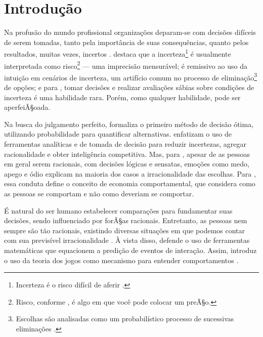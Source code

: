 \documentclass[
	article,			        %
	11pt,				          %
	oneside,			        %
	a4paper,			        %
	english,			        %
	brazil,				        %
	sumario=tradicional
]{abntex2}\usepackage[]{graphicx}\usepackage[]{color}
\begin{document}

\textual

\section*{Introdução}

Na profusão do mundo profissional organizações deparam-se com decisões difíceis de serem tomadas, tanto pela importância de suas consequências, quanto pelos resultados, muitas vezes, incertos \cite{Bekman.2009}.  destaca que a incerteza\footnote{Incerteza é o risco difícil de aferir \cite{Nate.2012}.} é usualmente interpretada como risco\footnote{Risco, conforme , é algo em que você pode colocar um preÃ§o.} --- uma imprecisão mensurável;  é remissivo ao uso da intuição em cenários de incerteza, um artifício comum no processo de eliminação\footnote{Escolhas são analisadas como um probabilístico processo de sucessivas eliminações \cite{Tversky.1972}.} de opções; e para , tomar decisões e realizar avaliações sábias sobre condições de incerteza é uma habilidade rara. Porém, como qualquer habilidade, pode ser aperfeiÃ§oada.

Na busca do julgamento perfeito,  formaliza o primeiro método de decisão ótima, utilizando probabilidade para quantificar alternativas.  enfatizam o uso de ferramentas analíticas e de tomada de decisão para reduzir incertezas, agregar racionalidade e obter inteligência competitiva. Mas, para , apesar de as pessoas em geral serem racionais, com decisões lógicas e sensatas, emoções como medo, apego e ódio explicam na maioria dos casos a irracionalidade das escolhas. Para , essa conduta define o conceito de economia comportamental, que considera como as pessoas se comportam e não como deveriam se comportar. 

É natural do ser humano estabelecer comparações para fundamentar suas decisões, sendo influenciado por forÃ§as racionais. Entretanto, as pessoas nem sempre são tão racionais, existindo diversas situações em que podemos contar com sua previsível irracionalidade \cite{Ariely.2012}. À vista disso,  defende o uso de ferramentas matemáticas que equacionem a predição de eventos de interação. Assim, introduz o uso da teoria dos jogos como mecanismo para entender comportamentos \cite[min.~2:17--2:37]{MesquitaTED.2009}.
\end{document}
